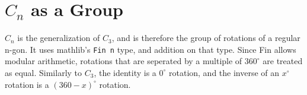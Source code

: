 \section{$C_n$ as a Group}

\begin{definition}[$C_n$]
    \label{definition : Cn}
    \leanok
    $C_n$ is the generalization of $C_3$, and is therefore the group of
    rotations of a regular n-gon. It uses mathlib's \verb|Fin n| type, and addition on
    that type. Since Fin allows modular arithmetic, rotations that are seperated
    by a multiple of $360^{\circ}$ are treated as equal. Similarly to $C_3$,
    the identity is a $0^{\circ}$ rotation, and the inverse of an $x ^{\circ}$
    rotation is a $(360 - x)^{\circ}$ rotation.
\end{definition}
